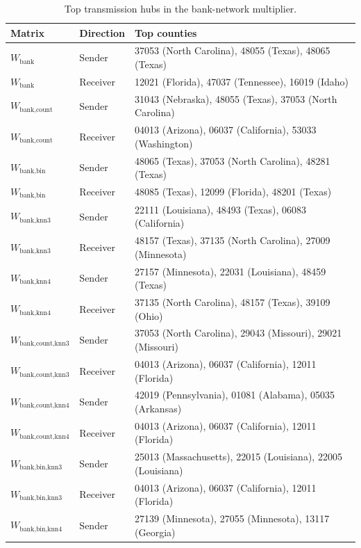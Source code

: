 \begin{table}[htbp]
  \centering
  \caption{Top transmission hubs in the bank-network multiplier.}
  \label{tab:hubs}
  \footnotesize
  \begin{tabular}{lll}
    \toprule
    Matrix & Direction & Top counties \\
    \midrule
    $W_{\text{bank}}$ & Sender & 37053 (North Carolina), 48055 (Texas), 48065 (Texas) \\
    $W_{\text{bank}}$ & Receiver & 12021 (Florida), 47037 (Tennessee), 16019 (Idaho) \\
    $W_{\text{bank,count}}$ & Sender & 31043 (Nebraska), 48055 (Texas), 37053 (North Carolina) \\
    $W_{\text{bank,count}}$ & Receiver & 04013 (Arizona), 06037 (California), 53033 (Washington) \\
    $W_{\text{bank,bin}}$ & Sender & 48065 (Texas), 37053 (North Carolina), 48281 (Texas) \\
    $W_{\text{bank,bin}}$ & Receiver & 48085 (Texas), 12099 (Florida), 48201 (Texas) \\
    $W_{\text{bank,knn3}}$ & Sender & 22111 (Louisiana), 48493 (Texas), 06083 (California) \\
    $W_{\text{bank,knn3}}$ & Receiver & 48157 (Texas), 37135 (North Carolina), 27009 (Minnesota) \\
    $W_{\text{bank,knn4}}$ & Sender & 27157 (Minnesota), 22031 (Louisiana), 48459 (Texas) \\
    $W_{\text{bank,knn4}}$ & Receiver & 37135 (North Carolina), 48157 (Texas), 39109 (Ohio) \\
    $W_{\text{bank,count,knn3}}$ & Sender & 37053 (North Carolina), 29043 (Missouri), 29021 (Missouri) \\
    $W_{\text{bank,count,knn3}}$ & Receiver & 04013 (Arizona), 06037 (California), 12011 (Florida) \\
    $W_{\text{bank,count,knn4}}$ & Sender & 42019 (Pennsylvania), 01081 (Alabama), 05035 (Arkansas) \\
    $W_{\text{bank,count,knn4}}$ & Receiver & 04013 (Arizona), 06037 (California), 12011 (Florida) \\
    $W_{\text{bank,bin,knn3}}$ & Sender & 25013 (Massachusetts), 22015 (Louisiana), 22005 (Louisiana) \\
    $W_{\text{bank,bin,knn3}}$ & Receiver & 04013 (Arizona), 06037 (California), 12011 (Florida) \\
    $W_{\text{bank,bin,knn4}}$ & Sender & 27139 (Minnesota), 27055 (Minnesota), 13117 (Georgia) \\

\end{tabular}
\end{table}
